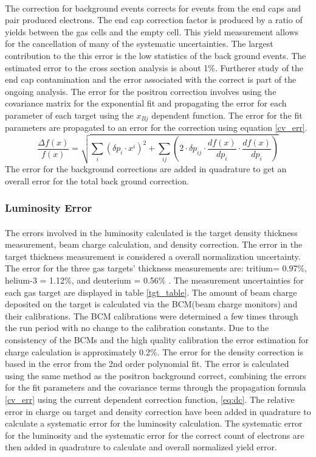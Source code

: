 \paragraph{}The correction for background events corrects for events from the end caps and pair produced electrons. The end cap correction factor is produced by a ratio of yields between the gas cells and the empty cell. This yield measurement allows for the cancellation of many of the systematic uncertainties. The largest contribution to the this error is the low statistics of the back ground events. The estimated error to the cross section analysis is about 1\%. Furtherer study of the end cap contamination and the error associated with the correct is part of the ongoing analysis. The error for the positron correction involves using the covariance matrix for the exponential fit and propagating the error for each parameter of each target using the $x_{Bj}$ dependent function. The error for the fit parameters are propagated to an error for the correction using equation \ref{cv_err}.
\begin{equation}
\frac{\Delta f(x)}{f(x)} =  \sqrt{ \sum_{i}^{} \left(\delta p_i\cdot x^i\right)^2 + \sum_{ij}^{}\left( 2\cdot \delta p_{ij}\cdot \dfrac{df(x)}{dp_i}\cdot \dfrac{df(x)}{dp_i}\right) } \label{cv_err}
\end{equation}
The error for the background corrections are added in quadrature to get an overall error for the total back ground correction.  
\subsubsection{Luminosity Error}
\paragraph{}The errors involved in the luminosity calculated is the target density thickness measurement, beam charge calculation, and density correction. The error in the target thickness measurement is considered a overall normalization uncertainty. The error for the three gas targets' thickness measurements are: tritium= 0.97\%, helium-3 = 1.12\%, and deuterium = 0.56\% \cite{HATT_eng}. The measurement uncertainties for each gas target are displayed in table \ref{tgt_table}. The amount of beam charge deposited on the target is calculated via the BCM(beam charge monitors) and their calibrations. The BCM calibrations were determined a few times through the run period with no change to the calibration constants. Due to the consistency of the BCMs and the high quality calibration the  error estimation for charge calculation is approximately 0.2\%. The error for the density correction is based in the error from the 2nd order polynomial fit. The error is calculated using the same method as the positron background correct, combining the errors for the fit parameters and the covariance terms through the propagation formula \ref{cv_err} using the current dependent correction function, \ref{eq:dc}. The relative error in charge on target and density correction have been added in quadrature to calculate a systematic error for the luminosity calculation. The systematic error for the luminosity and the systematic error for the correct count of electrons are then added in quadrature to calculate and overall normalized yield error.  
